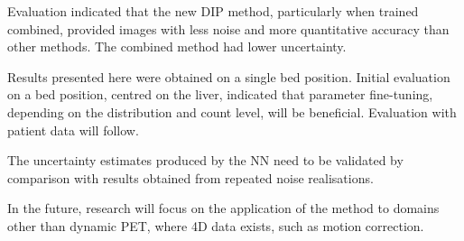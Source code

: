         Evaluation indicated that the new \gls{DIP} method, particularly when trained combined, provided images with less noise and more quantitative accuracy than other methods. The combined method had lower uncertainty.
    
        Results presented here were obtained on a single bed position. Initial evaluation on a bed position, centred on the liver, indicated that parameter fine-tuning, depending on the distribution and count level, will be beneficial. Evaluation with patient data will follow.
        
        The uncertainty estimates produced by the \gls{NN} need to be validated by comparison with results obtained from repeated noise realisations.
        
        In the future, research will focus on the application of the method to domains other than dynamic \gls{PET}, where \gls{4D} data exists, such as motion correction.
    